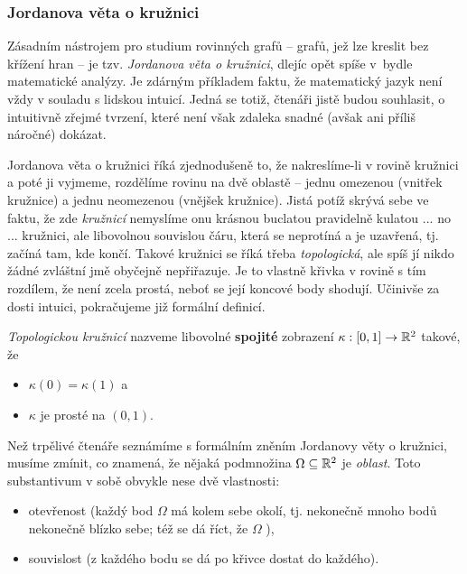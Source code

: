 \subsubsection{Jordanova věta o kružnici}
\label{sssec:jordanova-veta-o-kruznici}

Zásadním nástrojem pro studium rovinných grafů -- grafů, jež lze kreslit bez
křížení hran -- je tzv. \emph{Jordanova věta o kružnici}, dlejíc opět spíše
v~bydle matematické analýzy. Je zdárným příkladem faktu, že matematický jazyk
není vždy v souladu s lidskou intuicí. Jedná se totiž, čtenáři jistě budou
souhlasit, o intuitivně zřejmé tvrzení, které není však zdaleka snadné (avšak
ani příliš náročné) dokázat.

Jordanova věta o kružnici říká zjednodušeně to, že nakreslíme-li v rovině
kružnici a poté ji vyjmeme, rozdělíme rovinu na dvě oblastě -- jednu omezenou
(vnitřek kružnice) a jednu neomezenou (vnějšek kružnice). Jistá potíž skrývá
sebe ve faktu, že zde \emph{kružnicí} nemyslíme onu krásnou buclatou pravidelně
kulatou ... no ... kružnici, ale libovolnou souvislou čáru, která se neprotíná a
je uzavřená, tj. začíná tam, kde končí. Takové kružnici se říká třeba
\emph{topologická}, ale spíš jí nikdo žádné zvláštní jmě obyčejně nepřiřazuje.
Je to vlastně křivka v rovině s tím rozdílem, že není zcela prostá, neboť se
její koncové body shodují. Učinivše za dosti intuici, pokračujeme již formální
definicí.

\begin{definition}
 \label{def:topologicka-kruznice}
 \emph{Topologickou kružnicí} nazveme libovolné \textbf{spojité} zobrazení
 $\kappa: [0,1] \to \mathbb{R}^2$ takové, že
 \begin{itemize}
  \item $\kappa(0) = \kappa(1)$ a
  \item $\kappa$ je prosté na $(0,1)$.
 \end{itemize}
\end{definition}

Než trpělivé čtenáře seznámíme s formálním zněním Jordanovy věty o kružnici,
musíme zmínit, co znamená, že nějaká podmnožina $\Omega \subseteq \mathbb{R}^2$ je
\emph{oblast}. Toto substantivum v sobě obvykle nese dvě vlastnosti:
\begin{itemize}
 \item otevřenost (každý bod $\Omega$ má kolem sebe okolí, tj. nekonečně mnoho
  bodů nekonečně blízko sebe; též se dá říct, že $\Omega$ ),
 \item souvislost (z každého bodu se dá po křivce dostat do každého).
\end{itemize}

